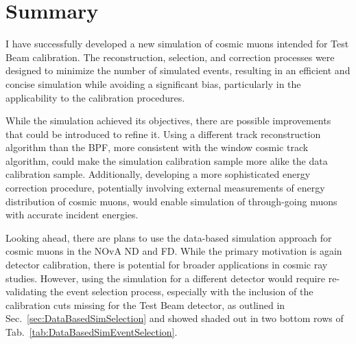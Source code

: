 \section{Summary}\label{sec:DataBasedSimSummary}
I have successfully developed a new simulation of cosmic muons intended for Test Beam calibration. The reconstruction, selection, and correction processes were designed to minimize the number of simulated events, resulting in an efficient and concise simulation while avoiding a significant bias, particularly in the applicability to the calibration procedures.

While the simulation achieved its objectives, there are possible improvements that could be introduced to refine it. Using a different track reconstruction algorithm than the \gls{BPF}, more consistent with the window cosmic track algorithm, could make the simulation calibration sample more alike the data calibration sample. Additionally, developing a more sophisticated energy correction procedure, potentially involving external measurements of energy distribution of cosmic muons, would enable simulation of through-going muons with accurate incident energies.

Looking ahead, there are plans to use the data-based simulation approach for cosmic muons in the \gls{NOvA} \gls{ND} and \gls{FD}. While the primary motivation is again detector calibration, there is potential for broader applications in cosmic ray studies. However, using the simulation for a different detector would require re-validating the event selection process, especially with the inclusion of the calibration cuts missing for the Test Beam detector, as outlined in Sec.~\ref{sec:DataBasedSimSelection} and showed shaded out in two bottom rows of Tab.~\ref{tab:DataBasedSimEventSelection}.